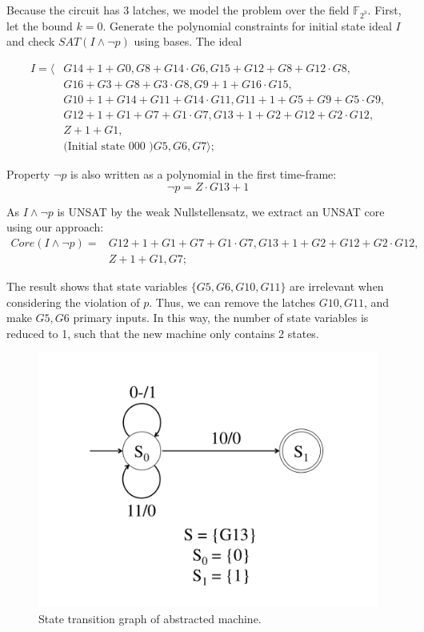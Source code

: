 \begin{Example}
Because the circuit has 3 latches, we model the problem over the field
${\mathbb{F}}_{2^3}$. First, let the bound $k = 0$. Generate the
polynomial constraints for initial state ideal $I$ and check $SAT(I\land
\neg p)$ using \Grobner bases. The ideal 

\begin{align*}
I = \langle & G14+1+G0, G8+G14\cdot G6, G15+G12+G8+G12\cdot G8,\\ 
	& G16+G3+G8+G3\cdot G8, G9+1+G16\cdot G15, \\ 
	& G10+1+G14+G11+G14\cdot G11, G11+1+G5+G9+G5\cdot G9, \\
	& G12+1+G1+G7+G1\cdot G7, G13+1+G2+G12+G2\cdot G12, \\
	& Z+1+G1, \\
	& \text{(Initial state 000 )} G5, G6, G7 \rangle;
\end{align*}

Property $\neg p$ is also written as a polynomial in the first
time-frame: 
\begin{equation*}
\neg p = Z\cdot G13 + 1
\end{equation*}

As $I\land \neg p$ is UNSAT by the weak
Nullstellensatz, we extract an UNSAT core using our approach:
\begin{align*}
Core(I\land \neg p) =& G12+1+G1+G7+G1\cdot G7, G13+1+G2+G12+G2\cdot G12, \\
& Z+1+G1, G7;
\end{align*}

The result shows that state variables $\{G5,G6, G10,G11\}$ are
irrelevant when considering the violation of $p$. Thus, we can remove
the latches $G10, G11$, and make $G5,G6$ primary inputs. In this way,
the number of state variables is reduced to 1, such that the new
machine only contains 2 states. 

\begin{figure}[H]
\centerline{\includegraphics[width=4.5in]{newfig/s27_stg_refined.pdf}}
\caption{State transition graph of abstracted machine.}
\label{fig:s27_stg_refined}
\end{figure}


\end{Example}
